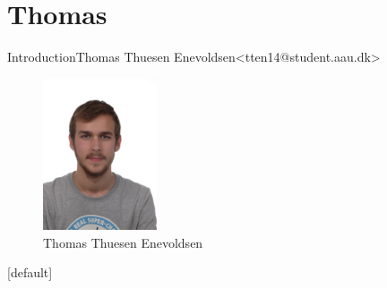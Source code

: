 \section{Thomas}


\begin{frame}{Introduction}{Thomas Thuesen Enevoldsen\newline<tten14@student.aau.dk>}
	\begin{figure}[h!]
    	\includegraphics[width=0.3\textwidth]{images/thomas.jpg}
    	\caption{Thomas Thuesen Enevoldsen}
		\centering    		
	\end{figure}
\end{frame}

[default]